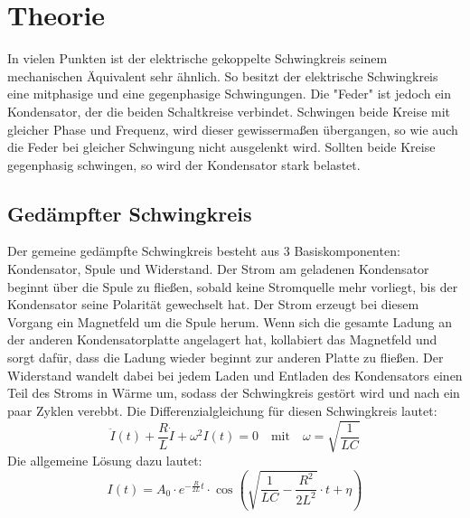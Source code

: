 \section{Theorie}
\label{sec:Theorie}

In vielen Punkten ist der elektrische gekoppelte Schwingkreis seinem mechanischen Äquivalent sehr ähnlich.
So besitzt der elektrische Schwingkreis eine mitphasige und eine gegenphasige Schwingungen. 
Die "Feder" ist jedoch ein Kondensator, der die beiden Schaltkreise verbindet.
Schwingen beide Kreise mit gleicher Phase und Frequenz, wird dieser gewissermaßen übergangen, so wie auch die Feder bei gleicher Schwingung nicht ausgelenkt wird.
Sollten beide Kreise gegenphasig schwingen, so wird der Kondensator stark belastet.
\subsection{Gedämpfter Schwingkreis}
Der gemeine gedämpfte Schwingkreis besteht aus 3 Basiskomponenten: Kondensator, Spule und Widerstand.
Der Strom am geladenen Kondensator beginnt über die Spule zu fließen, sobald keine Stromquelle mehr vorliegt, bis der Kondensator seine Polarität gewechselt hat.
Der Strom erzeugt bei diesem Vorgang ein Magnetfeld um die Spule herum. 
Wenn sich die gesamte Ladung an der anderen Kondensatorplatte angelagert hat, kollabiert das Magnetfeld und sorgt dafür, dass die Ladung wieder beginnt zur anderen Platte zu fließen.
Der Widerstand wandelt dabei bei jedem Laden und Entladen des Kondensators einen Teil des Stroms in Wärme um, sodass der Schwingkreis gestört wird und nach ein paar Zyklen verebbt.
Die Differenzialgleichung für diesen Schwingkreis lautet:
\begin{equation}
    \ddot{I}(t) + \frac{R}{L}\dot{I} + \omega^2 I(t) = 0 \quad\textrm{mit}\quad \omega = \sqrt{\frac{1}{LC}}
    \label{eq:harmossi}
\end{equation}
Die allgemeine Lösung dazu lautet:
\begin{equation}
    I(t) = A_0 \cdot e^{-\frac{R}{2L}t} \cdot \cos{(\sqrt{\frac{1}{LC}-\frac{R^2}{2L^2}}\cdot t+\eta)}
\end{equation}